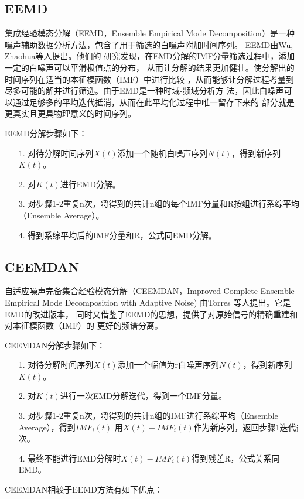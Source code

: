 \documentclass[AutoFakeBold]{LZUThesis}
\begin{document}
\subsection{EEMD}

集成经验模态分解（EEMD，Ensemble Empirical Mode Decomposition）是一种
噪声辅助数据分析方法，包含了用于筛选的白噪声附加时间序列。
EEMD由Wu, Zhaohua等人提出\cite{wu2009ensemble}。他们的
研究发现，在EMD分解的IMF分量筛选过程中，添加一定的白噪声可以平滑极值点的分布，
从而让分解的结果更加健壮。使分解出的时间序列在适当的本征模函数（IMF）中进行比较
，从而能够让分解过程考量到尽多可能的解并进行筛选。由于EMD是一种时域-频域分析方
法，因此白噪声可以通过足够多的平均迭代抵消，从而在此平均化过程中唯一留存下来的
部分就是更真实且更具物理意义的时间序列。

EEMD分解步骤如下：
\begin{itemize}
\item[1. ] 对待分解时间序列$X(t)$添加一个随机白噪声序列$N(t)$，得到新序列$K(t)$。
\item[2. ] 对$K(t)$进行EMD分解。
\item[3. ] 对步骤1-2重复n次，将得到的共计n组的每个IMF分量和R按组进行系综平均（Ensemble Average）。
\item[4. ] 得到系综平均后的IMF分量和R，公式同EMD分解。
\end{itemize}

\subsection{CEEMDAN}
自适应噪声完备集合经验模态分解（CEEMDAN，Improved Complete Ensemble
Empirical Mode Decomposition with Adaptive Noise) 由Torres
等人提出\cite{torres2011complete}。它是EMD的改进版本，
同时又借鉴了EEMD的思想，提供了对原始信号的精确重建和对本征模函数（IMF）的
更好的频谱分离。

CEEMDAN分解步骤如下：
\begin{itemize}
\item[1. ] 对待分解时间序列$X(t)$添加一个幅值为r白噪声序列$N(t)$，得到新序列$K(t)$。
\item[2. ] 对$K(t)$进行一次EMD分解迭代，得到一个IMF分量。
\item[3. ] 对步骤1-2重复n次，将得到的共计n组的IMF进行系综平均（Ensemble Average），得到$IMF_i(t)$
用$X(t)-IMF_i(t)$作为新序列，返回步骤1迭代j次。
\item[4. ] 最终不能进行EMD分解时$X(t)-IMF_i(t)$得到残差R，公式关系同EMD。
\end{itemize}

CEEMDAN相较于EEMD方法有如下优点：
\end{document}
